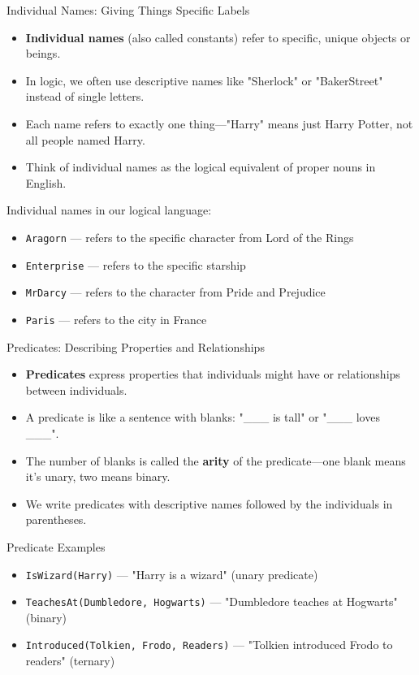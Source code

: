 \documentclass{beamer}
\begin{document}
	\begin{frame}{Individual Names: Giving Things Specific Labels}
		\begin{itemize}
			\item \textbf{Individual names} (also called constants) refer to specific, unique objects or beings.
			\item In logic, we often use descriptive names like "Sherlock" or "BakerStreet" instead of single letters.
			\item Each name refers to exactly one thing—"Harry" means just Harry Potter, not all people named Harry.
			\item Think of individual names as the logical equivalent of proper nouns in English.
		\end{itemize}
		
		\begin{example}
			Individual names in our logical language:
			\begin{itemize}
				\item \texttt{Aragorn} — refers to the specific character from Lord of the Rings
				\item \texttt{Enterprise} — refers to the specific starship
				\item \texttt{MrDarcy} — refers to the character from Pride and Prejudice
				\item \texttt{Paris} — refers to the city in France
			\end{itemize}
		\end{example}
	\end{frame}
	
	\begin{frame}{Predicates: Describing Properties and Relationships}
		\begin{itemize}
			\item \textbf{Predicates} express properties that individuals might have or relationships between individuals.
			\item A predicate is like a sentence with blanks: "\_\_\_ is tall" or "\_\_\_ loves \_\_\_".
			\item The number of blanks is called the \textbf{arity} of the predicate—one blank means it's unary, two means binary.
			\item We write predicates with descriptive names followed by the individuals in parentheses.
		\end{itemize}
		
		\begin{block}{Predicate Examples}
			\begin{itemize}
				\item \texttt{IsWizard(Harry)} — "Harry is a wizard" (unary predicate)
				\item \texttt{TeachesAt(Dumbledore, Hogwarts)} — "Dumbledore teaches at Hogwarts" (binary)
				\item \texttt{Introduced(Tolkien, Frodo, Readers)} — "Tolkien introduced Frodo to readers" (ternary)
			\end{itemize}
		\end{block}
	\end{frame}
	
\end{document}
